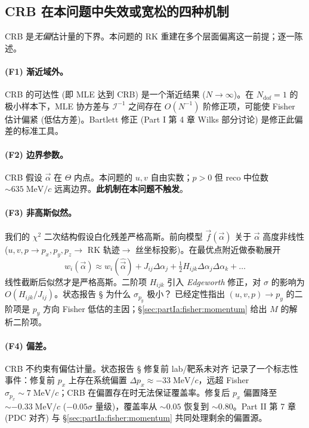 \subsection{CRB 在本问题中失效或宽松的四种机制}
\label{sec:partIa:crb:fail}

CRB 是\emph{无偏}估计量的下界。本问题的 RK 重建在多个层面偏离这一前提；逐一陈述。

\paragraph{(F1) 渐近域外。} CRB 的可达性 (即 MLE 达到 CRB) 是一个渐近结果 ($N\to\infty$)。在 $N_\mathrm{dof}=1$ 的极小样本下，MLE 协方差与 $\mathcal I^{-1}$ 之间存在 $O(N^{-1})$ 阶修正项，可能使 Fisher 估计偏紧 (低估方差)。Bartlett 修正 (Part I 第 4 章 Wilks 部分讨论) 是修正此偏差的标准工具。

\paragraph{(F2) 边界参数。} CRB 假设 $\vec\alpha$ 在 $\Theta$ 内点。本问题的 $u,v$ 自由实数；$p>0$ 但 reco 中位数 $\sim 635\;\mathrm{MeV}/c$ 远离边界。\textbf{此机制在本问题不触发}。

\paragraph{(F3) 非高斯似然。} 我们的 $\chi^2$ 二次结构假设白化残差严格高斯。前向模型 $\vec f(\vec\alpha)$ 关于 $\vec\alpha$ 高度非线性 ($u,v,p\to p_x,p_y,p_z\to$ RK 轨迹$\to$ 丝坐标投影)。在最优点附近做泰勒展开
\begin{equation}
  w_i(\vec\alpha)\approx w_i(\hat{\vec\alpha})+J_{ij}\Delta\alpha_j+\tfrac12 H_{ijk}\Delta\alpha_j\Delta\alpha_k+\dots
\end{equation}
线性截断后似然才是严格高斯。二阶项 $H_{ijk}$ 引入 \emph{Edgeworth} 修正，对 $\sigma$ 的影响为 $O(H_{ijk}/J_{ij})$。状态报告 § 为什么 $\sigma_{p_y}$ 极小？ 已经定性指出 $(u,v,p)\to p_y$ 的二阶项是 $p_y$ 方向 Fisher 低估的主因；§\ref{sec:partIa:fisher:momentum} 给出 $M$ 的解析二阶项。

\paragraph{(F4) 偏差。} CRB 不约束有偏估计量。状态报告 \StatusReport § 修复前 lab/靶系未对齐 记录了一个标志性事件：修复前 $p_x$ 上存在系统偏置 $\Delta p_x\approx -33\;\mathrm{MeV}/c$，远超 Fisher $\sigma_{p_x}\sim 7\;\mathrm{MeV}/c$；CRB 在偏置存在时无法保证覆盖率。修复后 $p_x$ 偏置降至 $\sim -0.33\;\mathrm{MeV}/c$ ($-0.05\sigma$ 量级)，覆盖率从 $\sim 0.05$ 恢复到 $\sim 0.80$。Part II 第 7 章 (PDC 对齐) 与 §\ref{sec:partIa:fisher:momentum} 共同处理剩余的偏置源。

